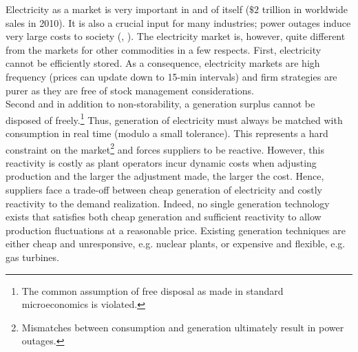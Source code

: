Electricity as a market is very important in and of itself ($\$2$ trillion in worldwide sales in 2010). It is also a crucial input for many industries; power outages induce very large costs to society (\cite{lacommare2004understanding}, \cite{reichl2013power}). 
The electricity market is, however, quite different from the markets for other commodities in a few respects. First, electricity cannot be efficiently stored. As a consequence, electricity markets are high frequency (prices can update down to 15-min intervals) and firm strategies are purer as they are free of stock management considerations. \\

Second and in addition to non-storability, a generation surplus cannot be disposed of freely.\footnote{The common assumption of free disposal as made in standard microeconomics is violated.} Thus, generation of electricity must always be matched with consumption in real time (modulo a small tolerance). This represents a hard constraint on the market\footnote{Mismatches between consumption and generation ultimately result in power outages.} and forces suppliers to be reactive. However, this reactivity is costly as plant operators incur dynamic costs when adjusting production and the larger the adjustment made, the larger the cost. 
Hence, suppliers face a trade-off between cheap generation of electricity and costly reactivity to the demand realization. Indeed, no single generation technology exists that satisfies both cheap generation and sufficient reactivity to allow production fluctuations at a reasonable price. Existing generation techniques are either cheap and unresponsive, e.g. nuclear plants, or expensive and flexible, e.g. gas turbines. \\
 
